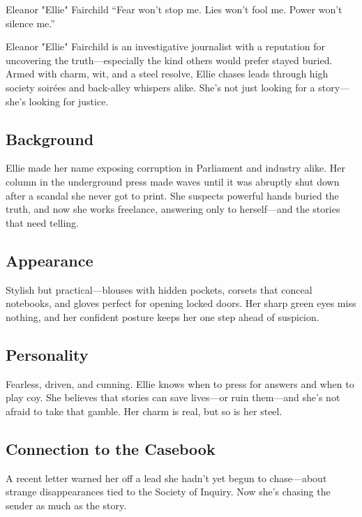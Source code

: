\begin{WyrdCharacterSheet}
    {Eleanor "Ellie" Fairchild} 
    {“Fear won't stop me. Lies won't fool me. Power won't silence me.”}
    \label{pc:eleanor-fairchild}

    Eleanor "Ellie" Fairchild is an investigative journalist with a reputation for uncovering the truth—especially the kind others would prefer stayed buried. Armed with charm, wit, and a steel resolve, Ellie chases leads through high society soirées and back-alley whispers alike. She’s not just looking for a story—she’s looking for justice.

    \subsection{Background}
    Ellie made her name exposing corruption in Parliament and industry alike. Her column in the underground press made waves until it was abruptly shut down after a scandal she never got to print. She suspects powerful hands buried the truth, and now she works freelance, answering only to herself—and the stories that need telling.

    \subsection{Appearance}
    Stylish but practical—blouses with hidden pockets, corsets that conceal notebooks, and gloves perfect for opening locked doors. Her sharp green eyes miss nothing, and her confident posture keeps her one step ahead of suspicion.

    \subsection{Personality}
    Fearless, driven, and cunning. Ellie knows when to press for answers and when to play coy. She believes that stories can save lives—or ruin them—and she’s not afraid to take that gamble. Her charm is real, but so is her steel.

    \subsection{Connection to the Casebook}
    A recent letter warned her off a lead she hadn’t yet begun to chase—about strange disappearances tied to the Society of Inquiry. Now she’s chasing the sender as much as the story.


\end{WyrdCharacterSheet}

